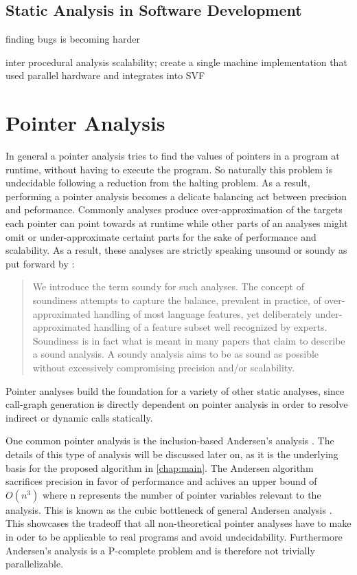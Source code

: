 \subsection{Static Analysis in Software Development}
finding bugs is becoming harder

inter procedural analysis scalability; create a single machine implementation that used parallel hardware and integrates into SVF


\section{Pointer Analysis}\label{sec:pta}
In general a pointer analysis tries to find the values of pointers in a program at runtime, without having to execute the program.
So naturally this problem is undecidable \cite{landi1992undecidability} following a reduction from the halting problem.
As a result, performing a pointer analysis becomes a delicate balancing act between precision and peformance.
Commonly analyses produce over-approximation of the targets each pointer can point towards at runtime while other parts of an analyses might omit or under-approximate certaint parts for the sake of performance and scalability.
As a result, these analyses are strictly speaking unsound or soundy as put forward by \cite{livshits2015defense}:

\begin{quote}
    We introduce the term soundy for
    such analyses. The concept of soundiness
    attempts to capture the balance,
    prevalent in practice, of over-approximated
    handling of most language features, yet deliberately
    under-approximated handling of a feature subset well
    recognized by experts. Soundiness is in
    fact what is meant in many papers that
    claim to describe a sound analysis. A
    soundy analysis aims to be as sound as
    possible without excessively compromising
    precision and/or scalability.
\end{quote}

Pointer analyses build the foundation for a variety of other static analyses, since call-graph generation is directly dependent on pointer analysis in order to resolve indirect or dynamic calls statically.

One common pointer analysis is the inclusion-based Andersen's analysis \cite{andersen1994program}. The details of this type of analysis will be discussed later on, as it is the underlying basis for the proposed algorithm in \autoref{chap:main}. The Andersen algorithm sacrifices precision in favor of performance and achives an upper bound of $O(n^3)$ where n represents the number of pointer variables relevant to the analysis. This is known as the cubic bottleneck of general Andersen analysis \cite{mathiasen2021fine}.
This showcases the tradeoff that all non-theoretical pointer analyses have to make in oder to be applicable to real programs and avoid undecidability. Furthermore Andersen's analysis is a P-complete problem and is therefore not trivially parallelizable.

